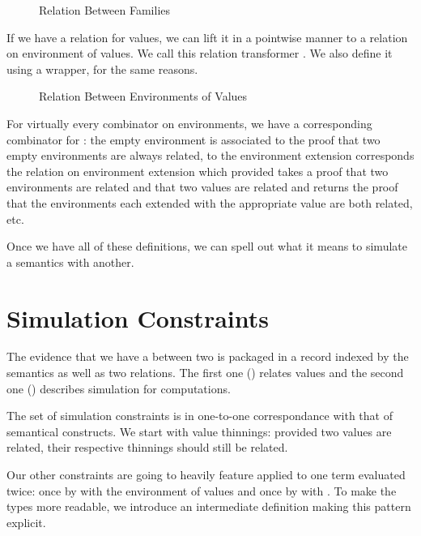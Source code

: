 \begin{figure}[h]
\caption{Relation Between  Families}
\end{figure}

If we have a relation for values, we can lift it in a pointwise manner to a relation
on environment of values. We call this relation transformer . We also define
it using a  wrapper, for the same reasons.

\begin{figure}[h]
\caption{Relation Between Environments of Values}
\end{figure}

For virtually every combinator on environments, we have a corresponding combinator
for : the empty environment  is associated to  the proof that
two empty environments are always related, to the environment extension  
corresponds the relation on environment extension  which provided takes a
proof that two environments are related and that two values are related and returns
the proof that the environments each extended with the appropriate value are both
related, etc.

Once we have all of these definitions, we can spell out what it means to simulate
a semantics with another.

\section{Simulation Constraints}

The evidence that we have a  between two  is
packaged in a record indexed by the semantics as well as two relations.
The first one () relates values and the second one ()
describes simulation for computations.


The set of simulation constraints is in one-to-one correspondance with that of
semantical constructs. We start with value thinnings: provided two values are
related, their respective thinnings should still be related.


Our other constraints are going to heavily feature  applied to one term evaluated
twice: once by  with the environment of values  and once by  with
. To make the types more readable, we introduce an intermediate definition 
making this pattern explicit.

